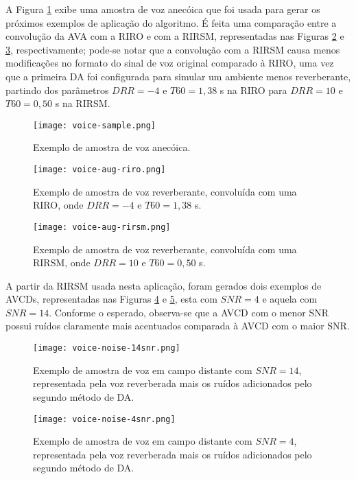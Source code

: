 A Figura \ref{fig:voice-sample} exibe uma amostra de voz anecóica que foi usada para gerar os próximos exemplos de aplicação
do algoritmo. É feita uma comparação entre a convolução da AVA com a RIRO e com a RIRSM, representadas nas Figuras \ref{fig:voice-aug-riro} e 
\ref{fig:voice-aug-rirsm}, respectivamente; pode-se notar que a convolução com a RIRSM causa menos modificações no formato do sinal de voz original 
comparado à RIRO, uma vez que a primeira DA foi configurada para simular um ambiente menos reverberante, partindo dos parâmetros $DRR=-4$ e $T60=1,38$ s
na RIRO para $DRR=10$ e $T60=0,50$ s na RIRSM.

\begin{figure} [H]
    \centering
    \texttt{[image: voice-sample.png]}
    \caption{Exemplo de amostra de voz anecóica.}
    \label{fig:voice-sample}
\end{figure} 

\begin{figure} [H]
    \centering
    \texttt{[image: voice-aug-riro.png]}
    \caption{Exemplo de amostra de voz reverberante, convoluída com uma RIRO, onde $DRR = -4$ e $T60=1,38$ s.}
    \label{fig:voice-aug-riro}
\end{figure} 

\begin{figure} [H]
    \centering
    \texttt{[image: voice-aug-rirsm.png]}
    \caption{Exemplo de amostra de voz reverberante, convoluída com uma RIRSM, onde $DRR = 10$ e $T60=0,50$ s.}
    \label{fig:voice-aug-rirsm}
\end{figure} 

A partir da RIRSM usada nesta aplicação, foram gerados dois exemplos de AVCDs, representadas nas Figuras \ref{fig:voice-noise-14snr} e 
\ref{fig:voice-noise-4snr}, esta com $SNR = 4$ e aquela com $SNR = 14$. Conforme o esperado, observa-se que a AVCD com o menor SNR
possui ruídos claramente mais acentuados comparada à AVCD com o maior SNR.

\begin{figure} [H]
    \centering
    \texttt{[image: voice-noise-14snr.png]}
    \caption{Exemplo de amostra de voz em campo distante com $SNR = 14$, representada pela voz reverberada mais os ruídos adicionados pelo segundo método de DA.}
    \label{fig:voice-noise-14snr}
\end{figure} 

\begin{figure} [H]
    \centering
    \texttt{[image: voice-noise-4snr.png]}
    \caption{Exemplo de amostra de voz em campo distante com $SNR = 4$, representada pela voz reverberada mais os ruídos adicionados pelo segundo método de DA.}
    \label{fig:voice-noise-4snr}
\end{figure} 